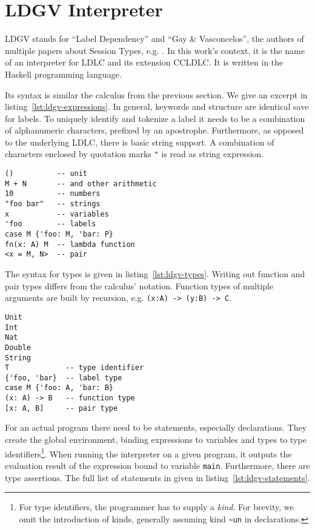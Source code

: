 \section{LDGV Interpreter}

LDGV stands for ``Label Dependency'' and ``Gay \& Vasconcelos'', the authors of multiple papers about Session Types, e.g. \cite{gayvasconcelos2010}. In this work's context, it is the name of an interpreter for LDLC and its extension CCLDLC. It is written in the Haskell programming language.

Its syntax is similar the calculus from the previous section. We give an excerpt in listing~\ref{lst:ldgv-expressions}. In general, keywords and structure are identical save for labels. To uniquely identify and tokenize a label it needs to be a combination of alphanumeric characters, prefixed by an apostrophe. Furthermore, as opposed to the underlying LDLC, there is basic string support. A combination of characters enclosed by quotation marks \texttt{"} is read as string expression.

\begin{lstlisting}[float,language=ldgv,
  caption={Expressions in LDGV (excerpt) with expressions \texttt{M,N,P}, variable \texttt{x} and type \texttt{A}},
  label=lst:ldgv-expressions]
()          -- unit
M + N       -- and other arithmetic
10          -- numbers
"foo bar"   -- strings
x           -- variables
'foo        -- labels
case M {'foo: M, 'bar: P}
fn(x: A) M  -- lambda function
<x = M, N>  -- pair
\end{lstlisting}

The syntax for types is given in listing~\ref{lst:ldgv-types}. Writing out function and pair types differs from the calculus' notation. Function types of multiple arguments are built by recursion, e.g. \texttt{(x:A) -> (y:B) -> C}.

\begin{lstlisting}[float,language=ldgv,
  caption={Types in LDGV (excerpt) with expression \texttt{M}, variable \texttt{x}, type identifier \texttt{T} and types \texttt{A,B}},
  label=lst:ldgv-types]
Unit
Int
Nat
Double
String
T             -- type identifier
{'foo, 'bar}  -- label type
case M {'foo: A, 'bar: B}
(x: A) -> B   -- function type
[x: A, B]     -- pair type
\end{lstlisting}

For an actual program there need to be statements, especially declarations. They create the global environment, binding expressions to variables and types to type identifiers\footnote{For type identifiers, the programmer has to supply a \emph{kind}. For brevity, we omit the introduction of kinds, generally assuming kind \texttt{\textasciitilde un} in declarations.}. When running the interpreter on a given program, it outputs the evaluation result of the expression bound to variable \texttt{main}. Furthermore, there are type assertions. The full list of statements in given in listing~\ref{lst:ldgv-statements}.

